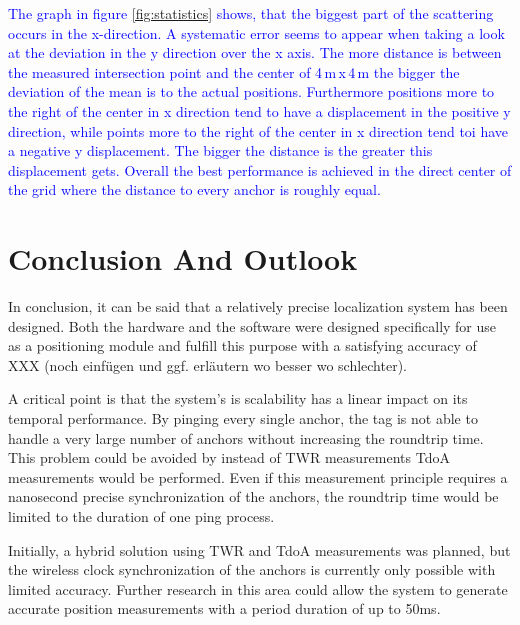 \documentclass[conference, a4paper]{IEEEtran}
\begin{document}
\textcolor{blue}{
The graph in figure \ref{fig:statistics} shows, that the biggest part of the scattering occurs in the x-direction. 
A systematic error seems to appear when taking a look at the deviation in the y direction over the x axis. 
The more distance is between the measured intersection point and the center of 4\,m\,x\,4\,m the bigger the deviation of the mean is to the actual positions. 
Furthermore positions more to the right of the center in x direction tend to have a displacement in the positive y direction, while points more to the right of the center in x direction tend toi have a negative y displacement. 
The bigger the distance is the greater this displacement gets. 
Overall the best performance is achieved in the direct center of the grid where the distance to every anchor is roughly equal.
}


\section{Conclusion And Outlook}\label{section:conclusion}
In conclusion, it can be said that a relatively precise localization system has been designed.
Both the hardware and the software were designed specifically for use as a positioning module and fulfill this purpose with a satisfying accuracy of XXX (noch einfügen und ggf. erläutern wo besser wo schlechter).

A critical point is that the system's is scalability has a linear impact on its temporal performance.
By pinging every single anchor, the tag is not able to handle a very large number of anchors without increasing the roundtrip time.
This problem could be avoided by instead of \ac{TWR} measurements \ac{TdoA} measurements would be performed.
Even if this measurement principle requires a nanosecond precise synchronization of the anchors,
the roundtrip time would be limited to the duration of one ping process.

Initially, a hybrid solution using \ac{TWR} and \ac{TdoA} measurements was planned,
but the wireless clock synchronization of the anchors is currently only possible with limited accuracy.
Further research in this area could allow the system to generate accurate position measurements with a period duration of up to 50ms.




 
\end{document}

